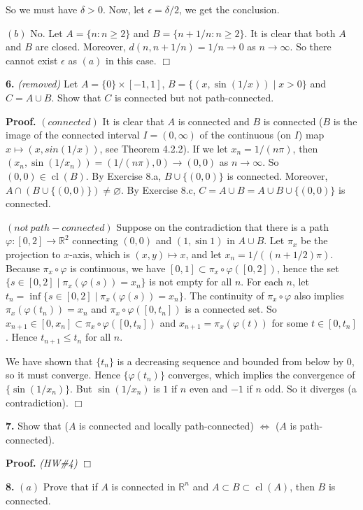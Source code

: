\documentclass{article}
\begin{document}
So we must have $\delta > 0$. Now, let $\epsilon = \delta /2$, we get
the conclusion.

$(b)$ No. Let $A = \{ n: n\ge 2\}$ and $B = \{n+1/n: n\ge 2\}$. It is
clear that both $A$ and $B$ are closed. Moreover,
$d(n, n+1/n) = 1/n \to 0$ as $n\to \infty$. So there cannot exist
$\epsilon$ as $(a)$ in this case. $\Box$

    \textbf{6.} \emph{(removed)} Let $A = \{0\}\times [-1,1]$,
$B = \{(x,\sin(1/x))\mid x > 0\}$ and $C = A\cup B$. Show that $C$ is
connected but not path-connected.

\textbf{Proof.} $(connected)$ It is clear that $A$ is connected and $B$
is connected ($B$ is the image of the connected interval $I=(0,\infty)$
of the continuous (on $I$) map $x\mapsto (x,sin(1/x))$, see Theorem
4.2.2). If we let $x_n = 1/(n\pi)$, then
$(x_n,\sin(1/x_n)) = (1/(n\pi), 0) \to (0,0)$ as $n\to \infty$. So
$(0,0) \in \operatorname{cl}(B)$. By Exercise 8.a, $B \cup \{(0,0)\}$ is
connected. Moreover, $A \cap (B\cup \{(0,0)\})\neq \varnothing$. By
Exercise 8.c, $C = A \cup B = A \cup B \cup \{(0,0)\}$ is connected.

$(not\ path-connected)$ Suppose on the contradiction that there is a
path $\varphi:[0,2]\to \mathbb{R}^2$ connecting $(0,0)$ and $(1,\sin 1)$
in $A\cup B$. Let $\pi_x$ be the projection to $x$-axis, which is
$(x,y)\mapsto x$, and let $x_n= 1/((n+1/2)\pi)$. Because
$\pi_x\circ \varphi$ is continuous, we have
$[0,1]\subset \pi_x\circ\varphi ([0,2])$, hence the set
$\{s\in [0,2]\mid \pi_x ( \varphi(s)) = x_n\}$ is not empty for all $n$.
For each $n$, let
$t_n = \inf\{s\in [0,2]\mid \pi_x ( \varphi(s)) = x_n\}$. The continuity
of $\pi_x\circ \varphi$ also implies $\pi_x(\varphi(t_n)) = x_n$ and
$\pi_x\circ \varphi([0, t_n])$ is a connected set. So
$x_{n+1}\in [0,x_n]\subset \pi_x\circ \varphi([0, t_n])$ and
$x_{n+1} = \pi_x(\varphi(t))$ for some $t\in [0,t_n]$. Hence
$t_{n+1}\le t_n$ for all $n$.

We have shown that $\{t_n\}$ is a decreasing sequence and bounded from
below by $0$, so it must converge. Hence $\{\varphi(t_n)\}$ converges,
which implies the convergence of $\{\sin (1/x_n)\}$. But $\sin (1/x_n)$
is $1$ if $n$ even and $-1$ if $n$ odd. So it diverges (a
contradiction). $\Box$

    \textbf{7.} Show that ($A$ is connected and locally path-connected)
$\Leftrightarrow$ ($A$ is path-connected).

\textbf{Proof.} \emph{(HW\#4)} $\Box$

    \textbf{8.} $(a)$ Prove that if $A$ is connected in $\mathbb{R}^n$ and
$A\subset B \subset \operatorname{cl}(A)$, then $B$ is connected.
\end{document}
